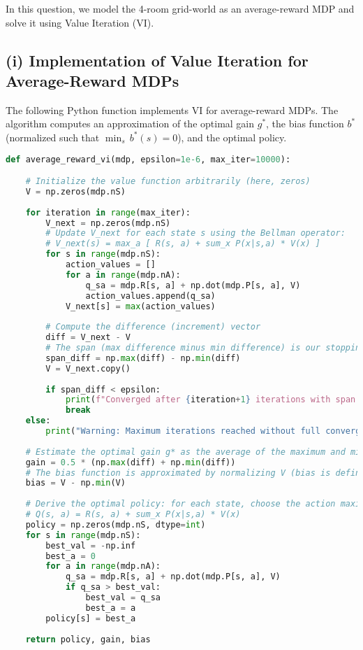 In this question, we model the 4-room grid-world as an average-reward MDP and solve it using Value Iteration (VI).

\subsection*{(i) Implementation of Value Iteration for Average-Reward MDPs}

The following Python function implements VI for average-reward MDPs. The algorithm computes an approximation of the optimal gain $g^*$, the bias function $b^*$ (normalized such that $\min_s\,b^*(s)=0$), and the optimal policy.

\begin{lstlisting}[language=Python, caption={Average-Reward Value Iteration Function}]
def average_reward_vi(mdp, epsilon=1e-6, max_iter=10000):

    # Initialize the value function arbitrarily (here, zeros)
    V = np.zeros(mdp.nS)
    
    for iteration in range(max_iter):
        V_next = np.zeros(mdp.nS)
        # Update V_next for each state s using the Bellman operator:
        # V_next(s) = max_a [ R(s, a) + sum_x P(x|s,a) * V(x) ]
        for s in range(mdp.nS):
            action_values = []
            for a in range(mdp.nA):
                q_sa = mdp.R[s, a] + np.dot(mdp.P[s, a], V)
                action_values.append(q_sa)
            V_next[s] = max(action_values)
        
        # Compute the difference (increment) vector
        diff = V_next - V
        # The span (max difference minus min difference) is our stopping criterion
        span_diff = np.max(diff) - np.min(diff)
        V = V_next.copy()
        
        if span_diff < epsilon:
            print(f"Converged after {iteration+1} iterations with span {span_diff:.2e}.")
            break
    else:
        print("Warning: Maximum iterations reached without full convergence.")
    
    # Estimate the optimal gain g* as the average of the maximum and minimum differences.
    gain = 0.5 * (np.max(diff) + np.min(diff))
    # The bias function is approximated by normalizing V (bias is defined up to an additive constant)
    bias = V - np.min(V)
    
    # Derive the optimal policy: for each state, choose the action maximizing:
    # Q(s, a) = R(s, a) + sum_x P(x|s,a) * V(x)
    policy = np.zeros(mdp.nS, dtype=int)
    for s in range(mdp.nS):
        best_val = -np.inf
        best_a = 0
        for a in range(mdp.nA):
            q_sa = mdp.R[s, a] + np.dot(mdp.P[s, a], V)
            if q_sa > best_val:
                best_val = q_sa
                best_a = a
        policy[s] = best_a
    
    return policy, gain, bias
\end{lstlisting}

